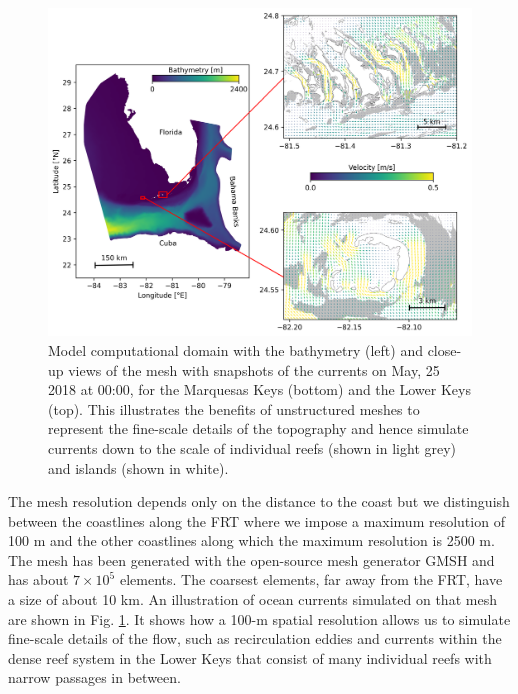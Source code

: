 \documentclass[utf8]{frontiersSCNS}
\begin{document}
\begin{figure}
    \centering
    \includegraphics[width=.9\textwidth]{figures/setup_3.png}
    \caption{Model computational domain with the bathymetry (left) and close-up views of the mesh with snapshots of the currents on May, 25 2018 at 00:00, for the Marquesas Keys (bottom) and the Lower Keys (top). This illustrates the benefits of unstructured meshes to represent the fine-scale details of the topography and hence simulate currents down to the scale of individual reefs (shown in light grey) and islands (shown in white).}
    \label{fig:setup}
\end{figure}

The mesh resolution depends only on the distance to the coast but we distinguish between the coastlines along the FRT where we impose a maximum resolution of 100 m and the other coastlines along which the maximum resolution is 2500 m. The mesh has been generated with the open-source mesh generator GMSH \citep{Geuzaine2009} and has about $7 \times 10^5$ elements. The coarsest elements, far away from the FRT, have a size of about 10 km. An illustration of ocean currents simulated on that mesh are shown in Fig. \ref{fig:setup}. It shows how a 100-m spatial resolution allows us to simulate fine-scale details of the flow, such as recirculation eddies and currents within the dense reef system in the Lower Keys that consist of many individual reefs with narrow passages in between. 
\end{document}
